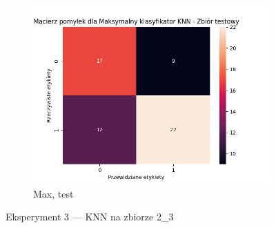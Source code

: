 \documentclass[12pt]{article}
\newcommand*{\subfigwidth}{0.24\textwidth}
\begin{document}
\begin{figure}[H]
\begin{subfigure}[t]{\subfigwidth}
        \includegraphics[width=\linewidth]{img/exp_3/knn/2_3/max/test_matrix.png}
        \caption{Max, test}
    \end{subfigure} 
    
    \caption{Eksperyment 3 --- KNN na zbiorze 2\_3}
\end{figure}

\clearpage
\end{document}
